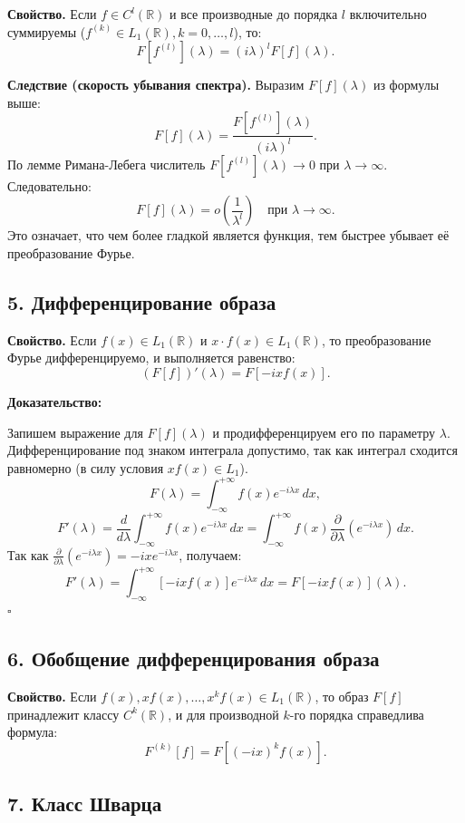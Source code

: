 \documentclass[12pt,a4paper,openany]{book}
\begin{document}
\textbf{Свойство.} Если $f \in C^l(\mathbb{R})$ и все производные до порядка $l$ включительно суммируемы ($f^{(k)} \in L_1(\mathbb{R}), k=0, \dots, l$), то:
\[
F[f^{(l)}](\lambda) = (i\lambda)^l F[f](\lambda).
\]

\textbf{Следствие (скорость убывания спектра).} Выразим $F[f](\lambda)$ из формулы выше:
\[
F[f](\lambda) = \frac{F[f^{(l)}](\lambda)}{(i\lambda)^l}.
\]
По лемме Римана-Лебега числитель $F[f^{(l)}](\lambda) \to 0$ при $\lambda \to \infty$. Следовательно:
\[
F[f](\lambda) = o\left( \frac{1}{\lambda^l} \right) \quad \text{при } \lambda \to \infty.
\]
Это означает, что чем более гладкой является функция, тем быстрее убывает её преобразование Фурье.

\subsection{5. Дифференцирование образа}

\textbf{Свойство.} Если $f(x) \in L_1(\mathbb{R})$ и $x \cdot f(x) \in L_1(\mathbb{R})$, то преобразование Фурье дифференцируемо, и выполняется равенство:
\[
(F[f])'(\lambda) = F[-ix f(x)].
\]

\textbf{Доказательство:}

Запишем выражение для $F[f](\lambda)$ и продифференцируем его по параметру $\lambda$. Дифференцирование под знаком интеграла допустимо, так как интеграл сходится равномерно (в силу условия $x f(x) \in L_1$).
\[
F(\lambda) = \int_{-\infty}^{+\infty} f(x) e^{-i\lambda x} \, dx,
\]
\[
F'(\lambda) = \frac{d}{d\lambda} \int_{-\infty}^{+\infty} f(x) e^{-i\lambda x} \, dx = \int_{-\infty}^{+\infty} f(x) \frac{\partial}{\partial \lambda} \left( e^{-i\lambda x} \right) \, dx.
\]
Так как $\frac{\partial}{\partial \lambda} (e^{-i\lambda x}) = -ix e^{-i\lambda x}$, получаем:
\[
F'(\lambda) = \int_{-\infty}^{+\infty} \left[ -ix f(x) \right] e^{-i\lambda x} \, dx = F[-ix f(x)](\lambda).
\]
\hfill $\square$

\subsection{6. Обобщение дифференцирования образа}

\textbf{Свойство.} Если $f(x), x f(x), \dots, x^k f(x) \in L_1(\mathbb{R})$, то образ $F[f]$ принадлежит классу $C^k(\mathbb{R})$, и для производной $k$-го порядка справедлива формула:
\[
F^{(k)}[f] = F\left[ (-ix)^k f(x) \right].
\]

\subsection{7. Класс Шварца}
\end{document}
